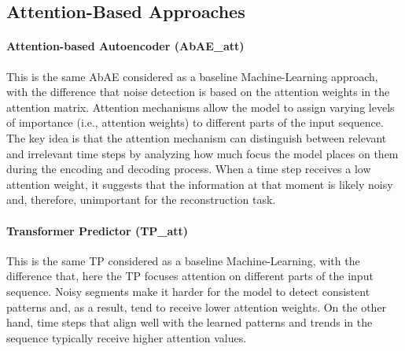 \documentclass[conference]{IEEEtran}
\begin{document}
\subsection{Attention-Based Approaches}

\paragraph{Attention-based Autoencoder (AbAE\_att)} This is the same AbAE considered as a baseline Machine-Learning approach, with the difference that noise detection is based on the attention weights in the attention matrix. Attention mechanisms allow the model to assign varying levels of importance (i.e., attention weights) to different parts of the input sequence. The key idea is that the attention mechanism can distinguish between relevant and irrelevant time steps by analyzing how much focus the model places on them during the encoding and decoding process. When a time step receives a low attention weight, it suggests that the information at that moment is likely noisy and, therefore, unimportant for the reconstruction task.

\paragraph{Transformer Predictor (TP\_att)} This is the same TP considered as a baseline Machine-Learning, with the difference that, here the TP focuses attention on different parts of the input sequence. Noisy segments make it harder for the model to detect consistent patterns and, as a result, tend to receive lower attention weights. On the other hand, time steps that align well with the learned patterns and trends in the sequence typically receive higher attention values.

\end{document}
